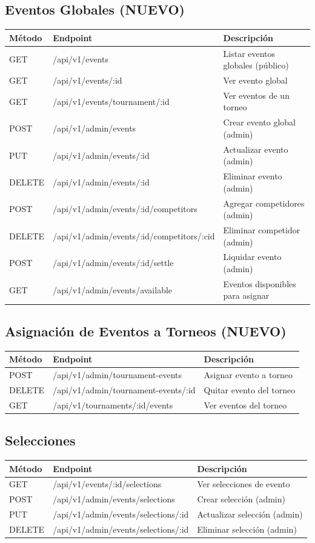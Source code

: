 \documentclass[12pt,a4paper]{article}
\begin{document}
\subsection{Eventos Globales (NUEVO)}
\begin{tabular}{|l|l|p{6cm}|}
\hline
\textbf{Método} & \textbf{Endpoint} & \textbf{Descripción} \\
\hline
GET & /api/v1/events & Listar eventos globales (público) \\
GET & /api/v1/events/:id & Ver evento global \\
GET & /api/v1/events/tournament/:id & Ver eventos de un torneo \\
POST & /api/v1/admin/events & Crear evento global (admin) \\
PUT & /api/v1/admin/events/:id & Actualizar evento (admin) \\
DELETE & /api/v1/admin/events/:id & Eliminar evento (admin) \\
POST & /api/v1/admin/events/:id/competitors & Agregar competidores (admin) \\
DELETE & /api/v1/admin/events/:id/competitors/:cid & Eliminar competidor (admin) \\
POST & /api/v1/admin/events/:id/settle & Liquidar evento (admin) \\
GET & /api/v1/admin/events/available & Eventos disponibles para asignar \\
\end{tabular}

\subsection{Asignación de Eventos a Torneos (NUEVO)}
\begin{tabular}{|l|l|p{6cm}|}
\hline
\textbf{Método} & \textbf{Endpoint} & \textbf{Descripción} \\
\hline
POST & /api/v1/admin/tournament-events & Asignar evento a torneo \\
DELETE & /api/v1/admin/tournament-events/:id & Quitar evento del torneo \\
GET & /api/v1/tournaments/:id/events & Ver eventos del torneo \\
\end{tabular}

\subsection{Selecciones}
\begin{tabular}{|l|l|p{6cm}|}
\hline
\textbf{Método} & \textbf{Endpoint} & \textbf{Descripción} \\
\hline
GET & /api/v1/events/:id/selections & Ver selecciones de evento \\
POST & /api/v1/admin/events/selections & Crear selección (admin) \\
PUT & /api/v1/admin/events/selections/:id & Actualizar selección (admin) \\
DELETE & /api/v1/admin/events/selections/:id & Eliminar selección (admin) \\
\end{tabular}
\end{document}
